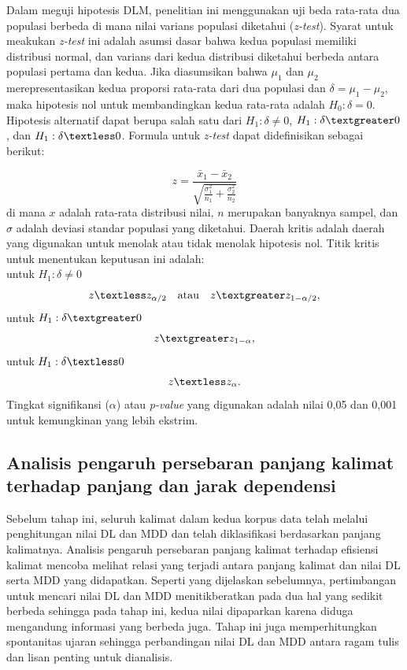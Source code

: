 Dalam meguji hipotesis DLM, penelitian ini menggunakan uji beda rata-rata dua populasi berbeda di mana nilai varians populasi diketahui (\textit{z-test}). Syarat untuk meakukan \textit{z-test} ini adalah asumsi dasar bahwa kedua populasi memiliki distribusi normal, dan varians dari kedua distribusi diketahui berbeda antara populasi pertama dan kedua. Jika diasumsikan bahwa $\mu_1$ dan $\mu_2$ merepresentasikan kedua proporsi rata-rata dari dua populasi dan $\delta=\mu_1 - \mu_2$, maka hipotesis nol untuk membandingkan kedua rata-rata adalah $H_0:\delta=0$. Hipotesis alternatif dapat berupa salah satu dari $H_1:\delta \neq0$, $H_1:\delta \textgreater0$, dan $H_1:\delta \textless0$. Formula untuk \textit{z-test} dapat didefinisikan sebagai berikut:

\begin{equation}
z=\frac{
	\bar{x}_1 - \bar{x}_2}{
	\sqrt{\frac{\sigma_1^2}{n_1} + \frac{\sigma_2^2}{n_2}}
	}
\end{equation}
di mana $x$ adalah rata-rata distribusi nilai, $n$ merupakan banyaknya sampel, dan $\sigma$ adalah deviasi standar populasi yang diketahui. Daerah kritis adalah daerah yang digunakan untuk menolak atau tidak menolak hipotesis nol. Titik kritis untuk menentukan keputusan ini adalah:\\
untuk $H_1:\delta \neq0$
\begin{equation}
z \textless z_{\alpha / 2}
\quad\mathrm{atau}\quad 
 z \textgreater z_{1-\alpha / 2},
\end{equation}
untuk $H_1:\delta \textgreater0$
\begin{equation}
 z \textgreater z_{1-\alpha},
\end{equation}
untuk $H_1:\delta \textless0$
\begin{equation}
 z \textless z_{\alpha}.
\end{equation}
Tingkat signifikansi ($\alpha$) atau \textit{p-value} yang digunakan adalah nilai 0,05 dan 0,001 untuk kemungkinan yang lebih ekstrim. 

\subsection{Analisis pengaruh persebaran panjang kalimat terhadap panjang dan jarak dependensi}
Sebelum tahap ini, seluruh kalimat dalam kedua korpus data telah melalui penghitungan nilai DL dan MDD dan telah diklasifikasi berdasarkan panjang kalimatnya. Analisis pengaruh persebaran panjang kalimat terhadap efisiensi kalimat mencoba melihat relasi yang terjadi antara panjang kalimat dan nilai DL serta MDD yang didapatkan. Seperti yang dijelaskan sebelumnya, pertimbangan untuk mencari nilai DL dan MDD menitikberatkan pada dua hal yang sedikit berbeda sehingga pada tahap ini, kedua nilai dipaparkan karena diduga mengandung informasi yang berbeda juga. Tahap ini juga memperhitungkan spontanitas ujaran sehingga perbandingan nilai DL dan MDD antara ragam tulis dan lisan penting untuk dianalisis. 

